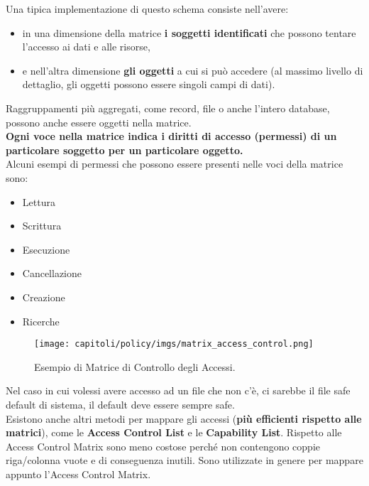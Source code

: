 Una tipica implementazione di questo schema consiste nell'avere:
\begin{itemize}
      \item in una dimensione della matrice \textbf{i soggetti identificati} che
            possono tentare l'accesso ai dati e alle risorse,
      \item e nell'altra dimensione \textbf{gli oggetti} a cui si può accedere
            (al massimo livello di dettaglio, gli oggetti possono essere singoli campi
            di dati).
\end{itemize}
Raggruppamenti più aggregati, come record, file o anche l'intero
database, possono anche essere oggetti nella matrice.\\
\textbf{Ogni voce nella matrice indica i diritti di accesso (permessi) di un
      particolare soggetto per un particolare oggetto.}\\
Alcuni esempi di permessi che possono essere presenti nelle voci della matrice
sono:
\begin{itemize}
      \item Lettura
      \item Scrittura
      \item Esecuzione
      \item Cancellazione
      \item Creazione
      \item Ricerche
\end{itemize}

\begin{figure}[H]
      \centering
      \texttt{[image: capitoli/policy/imgs/matrix\_access\_control.png]}
      \caption{Esempio di Matrice di Controllo degli Accessi.}
\end{figure}

\noindent Nel caso in cui volessi avere accesso ad un file che non c'è, ci
sarebbe il file safe default di sistema, il default deve essere sempre safe. \\
Esistono anche altri metodi per mappare gli accessi (\textbf{più efficienti
      rispetto alle matrici}), come le \textbf{Access Control List} e le \textbf{Capability
      List}. Rispetto alle Access Control Matrix sono meno costose perché non
contengono coppie riga/colonna vuote e di conseguenza inutili. Sono utilizzate
in genere per mappare appunto l'Access Control Matrix.

